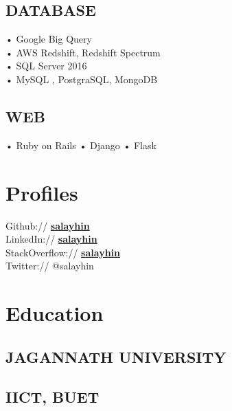 \documentclass[letterpaper]{deedy-resume} %
\begin{document}
\begin{minipage}[t]{0.33\textwidth}
\subsection{DATABASE}
• Google Big Query \\
• AWS Redshift, Redshift Spectrum  \\
• SQL Server 2016 \\
• MySQL , PostgraSQL, MongoDB
\sectionspace %

\subsection{WEB}
• Ruby on Rails • Django • Flask

\sectionspace %


\section{Profiles} 
Github:// \href{https://github.com/salayhin}{\bf salayhin} \\
LinkedIn:// \href{https://www.linkedin.com/in/salayhin}{\bf salayhin} \\
StackOverflow:// \href{https://stackoverflow.com/users/717600/sirajus-salayhin}{\bf salayhin} \\
Twitter:// @salayhin
\sectionspace %

\section{Education} 
\subsection{JAGANNATH UNIVERSITY}

\sectionspace %

\subsection{IICT, BUET}


\end{minipage} %
\end{document}
